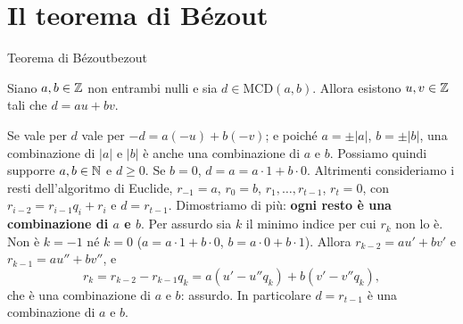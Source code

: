 \section{Il teorema di Bézout}\label{sec:bezout}

\begin{concetto}
\begin{Teorema}{Teorema di Bézout}{bezout}
    \begin{prerequisiti}
    \end{prerequisiti}
    Siano $a, b \in \mathbb{Z}$ non entrambi nulli e sia $d \in \mathrm{MCD}(a, b)$. Allora esistono $u, v \in \mathbb{Z}$ tali che $d = au + bv$.
\end{Teorema}
\begin{dimostrazione}
    Se vale per $d$ vale per $-d = a(-u) + b(-v)$; e poiché $a = \pm |a|$, $b = \pm |b|$, una combinazione di $|a|$ e $|b|$ è anche una
    combinazione di $a$ e $b$. Possiamo quindi supporre $a, b \in \mathbb{N}$ e $d \geq 0$. Se $b = 0$, $d = a = a \cdot 1 + b \cdot 0$. Altrimenti
    consideriamo i resti dell'algoritmo di Euclide, $r_{-1} = a$, $r_0 = b$, $r_1, \dots, r_{t - 1}$, $r_t = 0$, con $r_{i - 2} = r_{i - 1}q_i + r_i$ e
    $d = r_{t - 1}$. Dimostriamo di più: \textbf{ogni resto è una combinazione di $a$ e $b$}. Per assurdo sia $k$ il minimo indice per cui
    $r_k$ non lo è. Non è $k = -1$ né $k = 0$ ($a = a \cdot 1 + b \cdot 0$, $b = a \cdot 0 + b \cdot 1$). Allora $r_{k - 2} = au' + bv'$ e
    $r_{k - 1} = au'' + bv''$, e
    \[ r_k = r_{k - 2} - r_{k - 1}q_k = a(u' - u''q_k) + b(v' - v''q_k), \]
    che è una combinazione di $a$ e $b$: assurdo. In particolare $d = r_{t - 1}$ è una combinazione di $a$ e $b$.
\end{dimostrazione}
\end{concetto}

